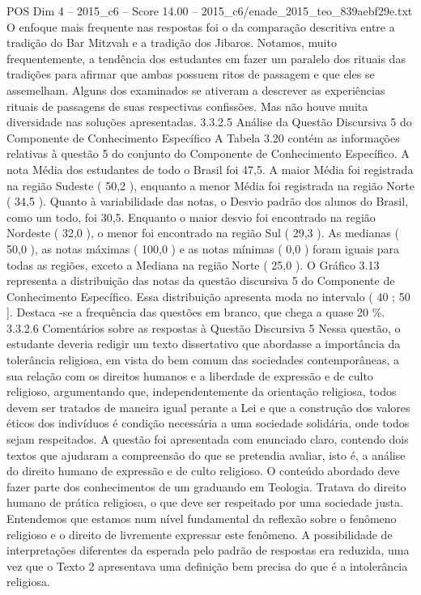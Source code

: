 \begin{textsample}{POS Dim 4 – 2015\_c6 – Score 14.00 – 2015\_c6/enade\_2015\_teo\_839aebf29e.txt}
O enfoque mais frequente nas respostas foi o da comparação descritiva entre a tradição do Bar Mitzvah e a tradição dos Jibaros.
Notamos, muito frequentemente, a tendência dos estudantes em fazer um paralelo dos rituais das tradições para afirmar que ambas possuem ritos de passagem e que eles se assemelham.
Alguns dos examinados se ativeram a descrever as experiências rituais de passagens de suas respectivas confissões.
Mas não houve muita diversidade nas soluções apresentadas. 3.3.2.5 Análise da Questão Discursiva 5 do Componente de Conhecimento Específico A Tabela 3.20 contém as informações relativas à questão 5 do conjunto do Componente de Conhecimento Específico.
A nota Média dos estudantes de todo o Brasil foi 47,5.
A maior Média foi registrada na região Sudeste ( 50,2 ), enquanto a menor Média foi registrada na região Norte ( 34,5 ).
Quanto à variabilidade das notas, o Desvio padrão dos alunos do Brasil, como um todo, foi 30,5.
Enquanto o maior desvio foi encontrado na região Nordeste ( 32,0 ), o menor foi encontrado na região Sul ( 29,3 ).
As medianas ( 50,0 ), as notas máximas ( 100,0 ) e as notas mínimas ( 0,0 ) foram iguais para todas as regiões, exceto a Mediana na região Norte ( 25,0 ).
O Gráfico 3.13 representa a distribuição das notas da questão discursiva 5 do Componente de Conhecimento Específico.
Essa distribuição apresenta moda no intervalo ( 40 ; 50 ].
Destaca -se a frequência das questões em branco, que chega a quase 20 \%. 3.3.2.6 Comentários sobre as respostas à Questão Discursiva 5 Nessa questão, o estudante deveria redigir um texto dissertativo que abordasse a importância da tolerância religiosa, em vista do bem comum das sociedades contemporâneas, a sua relação com os direitos humanos e a liberdade de expressão e de culto religioso, argumentando que, independentemente da orientação religiosa, todos devem ser tratados de maneira igual perante a Lei e que a construção dos valores éticos dos indivíduos é condição necessária a uma sociedade solidária, onde todos sejam respeitados.
A questão foi apresentada com enunciado claro, contendo dois textos que ajudaram a compreensão do que se pretendia avaliar, isto é, a análise do direito humano de expressão e de culto religioso.
O conteúdo abordado deve fazer parte dos conhecimentos de um graduando em Teologia.
Tratava do direito humano de prática religiosa, o que deve ser respeitado por uma sociedade justa.
Entendemos que estamos num nível fundamental da reflexão sobre o fenômeno religioso e o direito de livremente expressar este fenômeno.
A possibilidade de interpretações diferentes da esperada pelo padrão de respostas era reduzida, uma vez que o Texto 2 apresentava uma definição bem precisa do que é a intolerância religiosa.

\end{textsample}
